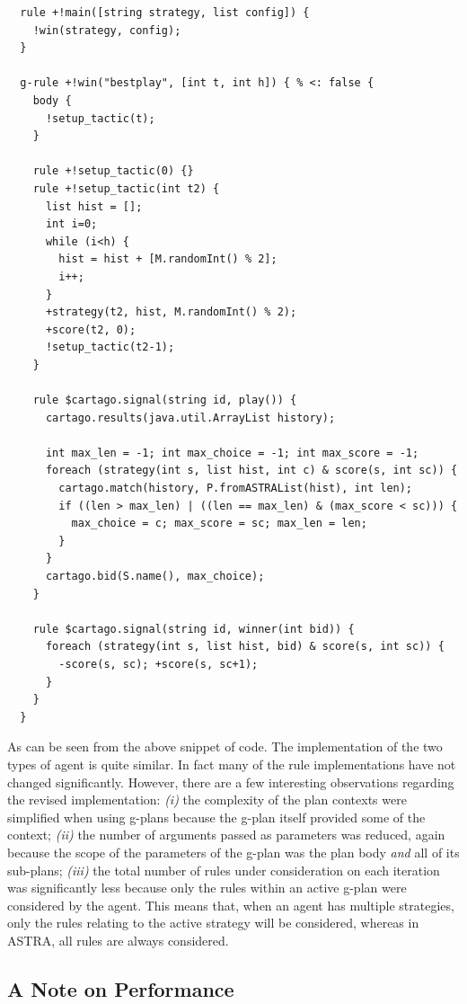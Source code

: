 {\footnotesize
\begin{verbatim}
  rule +!main([string strategy, list config]) {
    !win(strategy, config);
  }
  
  g-rule +!win("bestplay", [int t, int h]) { % <: false {
    body {
      !setup_tactic(t);
    }

    rule +!setup_tactic(0) {}
    rule +!setup_tactic(int t2) {
      list hist = [];
      int i=0;
      while (i<h) {
        hist = hist + [M.randomInt() % 2];
        i++;
      }
      +strategy(t2, hist, M.randomInt() % 2);
      +score(t2, 0);
      !setup_tactic(t2-1);
    }

    rule $cartago.signal(string id, play()) {
      cartago.results(java.util.ArrayList history);
			
      int max_len = -1; int max_choice = -1; int max_score = -1;
      foreach (strategy(int s, list hist, int c) & score(s, int sc)) {
        cartago.match(history, P.fromASTRAList(hist), int len);
        if ((len > max_len) | ((len == max_len) & (max_score < sc))) {
          max_choice = c; max_score = sc; max_len = len;
        }
      }		
      cartago.bid(S.name(), max_choice);
    }
		
    rule $cartago.signal(string id, winner(int bid)) {
      foreach (strategy(int s, list hist, bid) & score(s, int sc)) {
        -score(s, sc); +score(s, sc+1);
      }
    }
  }
\end{verbatim}}

As can be seen from the above snippet of code. The implementation of the two types of agent
is quite similar. In fact many of the rule implementations have not changed significantly.
However, there are a few interesting observations regarding the revised implementation: \emph{(i)} the 
complexity of the plan contexts were simplified when using g-plans because the g-plan itself 
provided some of the context; \emph{(ii)} the number of arguments passed as parameters was reduced, 
again because the scope of the parameters of the g-plan was the plan body \emph{and} all of 
its sub-plans; \emph{(iii)} the total number of rules under consideration on each iteration was
significantly less because only the rules within an active g-plan were considered by the
agent. This means that, when an agent has multiple strategies, only the rules relating to
the active strategy will be considered, whereas in ASTRA, all rules are always considered.

\subsection{A Note on Performance}
\label{performance}

